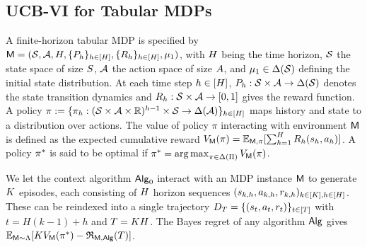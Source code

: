 \subsection{UCB-VI for Tabular MDPs}\label{sec:Tabular-MDP-statement}


A finite-horizon tabular MDP is specified by ${\mathsf{M}}=({\mathcal{S}},{\mathcal{A}}, {H}, \{{P}_h\}_{h\in[{H}]},\{{R}_h\}_{h\in[{H}]},{\mu_1})$, with ${H}$ being the time horizon, ${\mathcal{S}}$ the state space of size ${S}$, ${\mathcal{A}}$ the action space of size ${A}$, and ${\mu_1}\in\Delta({\mathcal{S}})$ defining the initial state distribution. At each time step $h\in[{H}]$, ${P}_h: {\mathcal{S}}\times{\mathcal{A}} \to \Delta({\mathcal{S}})$ denotes the state transition dynamics and ${R}_h:{\mathcal{S}} \times {\mathcal{A}} \to [0,1]$ gives the reward function. A policy ${\pi}:=\{{\pi}_h:({\mathcal{S}} \times{\mathcal{A}} \times \mathbb{R})^{h-1}\times{\mathcal{S}} \to\Delta({\mathcal{A}})\}_{h \in [{H}]}$ maps history and state to a distribution over actions. The value of policy $\pi$ interacting with environment ${\mathsf{M}}$ is defined as the expected cumulative reward ${V}_{\mathsf{M}}({\pi})=\mathbb{E}_{{\mathsf{M}},{\pi}}[\sum_{h=1}^{H} {R}_h ({s}_h,{a}_h)]$. A policy ${\pi^*}$ is said to be optimal if ${\pi^*}=\operatorname*{arg\,max}_{\pi\in\Delta({\Pi})}{V}_{\mathsf{M}}(\pi)$. 


We let the context algorithm ${\mathsf{Alg}}_0$ interact with an MDP instance ${\mathsf{M}}$ to generate ${K}$ episodes, each consisting of ${H}$ horizon sequences $ ({s}_{k,h},{a}_{k,h},{r}_{k,h})_{k \in [{K}], h \in [{H}]}$. These can be reindexed into a single trajectory ${D}_{{T}} = \{ ({s}_t,{a}_t,{r}_t) \}_{t \in [{T}]}$ with $t=H(k-1)+h$ and ${T}={K}{H}$. The Bayes regret of any algorithm ${\mathsf{Alg}}$ gives $\mathbb{E}_{{\mathsf{M}}\sim{\Lambda}}[{K}{{V}}_{\mathsf{M}}({\pi}^*)-{\mathfrak{R}}_{{\mathsf{M}},{\mathsf{Alg}}}({T})]$. 



